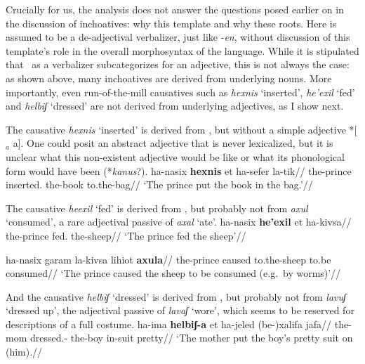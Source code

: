 Crucially for us, the analysis does not answer the questions posed earlier on in the discussion of inchoatives: why this template and why these roots. Here {\thif} is assumed to be a de-adjectival verbalizer, just like -\emph{en}, without discussion of this template's role in the overall morphosyntax of the language. While it is stipulated that \thif~as a verbalizer subcategorizes for an adjective, this is not always the case: as shown above, many inchoatives are derived from underlying nouns. More importantly, even run-of-the-mill causatives such as \emph{hexnis} `inserted', \emph{he'exil} `fed' and \emph{helbiʃ} `dressed' are not derived from underlying adjectives, as I show next.

The causative \emph{hexnis} `inserted' is derived from , but without a simple adjective *[$_{a}$  a]. One could posit an abstract adjective that is never lexicalized, but it is unclear what this non-existent adjective would be like or what its phonological form would have been (*\emph{kanus}?).
\ex \begingl
	\gla ha-nasix \textbf{hexnis} et ha-sefer la-tik//
	\glb the-prince inserted.  the-book to.the-bag//
	\glft `The prince put the book in the bag.'//
	\endgl
\xe

The causative \emph{heexil} `fed' is derived from , but probably not from \emph{axul} `consumed', a rare adjectival passive of \emph{axal} `ate'.
\pex
	\a \begingl
		\gla ha-nasix \textbf{he'exil} et ha-kivsa//
		\glb the-prince fed.  the-sheep//
		\glft `The prince fed the sheep'//
		\endgl
		
	\a \ljudge{$\ne$} \begingl
		\gla ha-nasix garam la-kivsa lihiot \textbf{axula}//
		\glb the-prince caused to.the-sheep to.be consumed//
		\glft `The prince caused the sheep to be consumed (e.g.~by worms)'//
		\endgl
\xe

And the causative \emph{helbiʃ} `dressed' is derived from , but probably not from \emph{lavuʃ} `dressed up', the adjectival passive of \emph{lavaʃ} `wore', which seems to be reserved for descriptions of a full costume.
\pex
	\a \begingl
		\gla ha-ima \textbf{helbiʃ-a} et ha-jeled (be-)xalifa jafa//
		\glb the-mom dressed.-  the-boy in-suit pretty//
		\glft `The mother put the boy's pretty suit on (him).//
		\endgl
	
